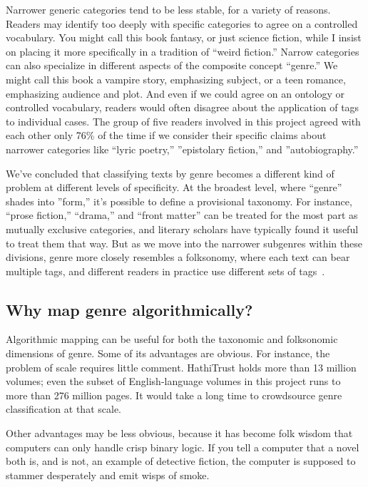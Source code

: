 \documentclass[paper=a4, fontsize=12pt]{scrartcl}
\numberwithin{equation}{section}		%
\numberwithin{figure}{section}			%
\numberwithin{table}{section}				%
\begin{document}
Narrower generic categories tend to be less stable, for a variety of reasons. Readers may identify too deeply with specific categories to agree on a controlled vocabulary. You might call this book fantasy, or just science fiction, while I insist on placing it more specifically in a tradition of ``weird fiction.'' Narrow categories can also specialize in different aspects of the composite concept ``genre.'' We might call this book a vampire story, emphasizing subject, or a teen romance, emphasizing audience and plot. And even if we could agree on an ontology or controlled vocabulary, readers would often disagree about the application of tags to individual cases. The group of five readers involved in this project agreed with each other only 76\% of the time if we consider their specific claims about narrower categories like ``lyric poetry,'' ''epistolary fiction,'' and ''autobiography.''

We've concluded that classifying texts by genre becomes a different kind of problem at different levels of specificity. At the broadest level, where ``genre'' shades into ''form,'' it's possible to define a provisional taxonomy. For instance, ``prose fiction,'' ``drama,'' and ``front matter'' can be treated for the most part as mutually exclusive categories, and literary scholars have typically found it useful to treat them that way. But as we move into the narrower subgenres within these divisions, genre more closely resembles a folksonomy, where each text can bear multiple tags, and different readers in practice use different sets of tags~\cite{vanderwal:folksonomy}.

\subsection{Why map genre algorithmically?}

Algorithmic mapping can be useful for both the taxonomic and folksonomic dimensions of genre. Some of its advantages are obvious. For instance, the problem of scale requires little comment. HathiTrust holds more than 13 million volumes; even the subset of English-language volumes in this project runs to more than 276 million pages. It would take a long time to crowdsource genre classification at that scale.

Other advantages may be less obvious, because it has become folk wisdom that computers can only handle crisp binary logic. If you tell a computer that a novel both is, and is not, an example of detective fiction, the computer is supposed to stammer desperately and emit wisps of smoke.
\end{document}
